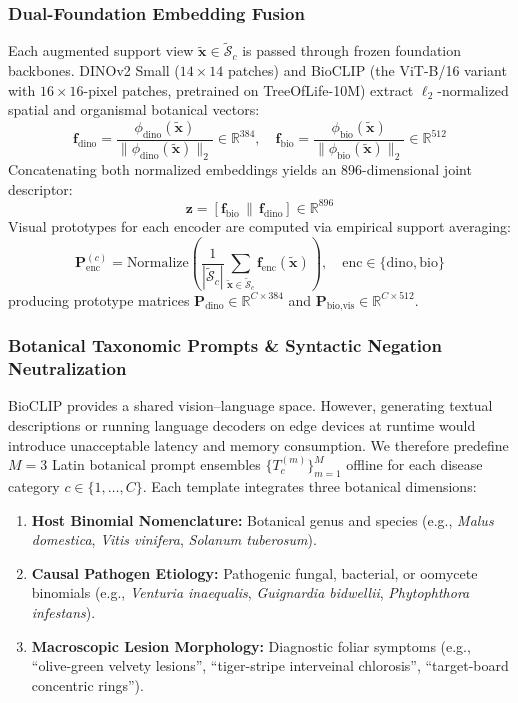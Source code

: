 \documentclass[preprint,12pt]{elsarticle}
\begin{document}
\subsubsection{Dual-Foundation Embedding Fusion}
Each augmented support view $\tilde{\mathbf{x}} \in \tilde{\mathcal{S}}_c$ is passed through frozen foundation backbones. DINOv2 Small ($14\times 14$ patches) \cite{oquab2023dinov2} and BioCLIP (the ViT-B/16 variant with $16\times16$-pixel patches, pretrained on TreeOfLife-10M) \cite{stevens2024bioclip} extract $\ell_2$-normalized spatial and organismal botanical vectors:
\begin{equation}
    \mathbf{f}_{\text{dino}} = \frac{\phi_{\text{dino}}(\tilde{\mathbf{x}})}{\|\phi_{\text{dino}}(\tilde{\mathbf{x}})\|_2} \in \mathbb{R}^{384}, \quad
    \mathbf{f}_{\text{bio}} = \frac{\phi_{\text{bio}}(\tilde{\mathbf{x}})}{\|\phi_{\text{bio}}(\tilde{\mathbf{x}})\|_2} \in \mathbb{R}^{512}
\end{equation}
Concatenating both normalized embeddings yields an 896-dimensional joint descriptor:
\begin{equation}
    \mathbf{z} = [\mathbf{f}_{\text{bio}} \,\|\, \mathbf{f}_{\text{dino}}] \in \mathbb{R}^{896}
\end{equation}
Visual prototypes for each encoder are computed via empirical support averaging:
\begin{equation}
    \mathbf{P}_{\text{enc}}^{(c)} = \text{Normalize}\left(\frac{1}{|\tilde{\mathcal{S}}_c|}\sum_{\tilde{\mathbf{x}} \in \tilde{\mathcal{S}}_c} \mathbf{f}_{\text{enc}}(\tilde{\mathbf{x}})\right), \quad \text{enc} \in \{\text{dino}, \text{bio}\}
\end{equation}
producing prototype matrices $\mathbf{P}_{\text{dino}} \in \mathbb{R}^{C \times 384}$ and $\mathbf{P}_{\text{bio,vis}} \in \mathbb{R}^{C \times 512}$.

\subsubsection{Botanical Taxonomic Prompts \& Syntactic Negation Neutralization}
BioCLIP provides a shared vision--language space. However, generating textual descriptions or running language decoders on edge devices at runtime would introduce unacceptable latency and memory consumption. We therefore predefine $M=3$ Latin botanical prompt ensembles $\{T_c^{(m)}\}_{m=1}^M$ offline for each disease category $c \in \{1, \dots, C\}$. Each template integrates three botanical dimensions:
\begin{enumerate}
    \item \textbf{Host Binomial Nomenclature:} Botanical genus and species (e.g., \textit{Malus domestica}, \textit{Vitis vinifera}, \textit{Solanum tuberosum}).
    \item \textbf{Causal Pathogen Etiology:} Pathogenic fungal, bacterial, or oomycete binomials (e.g., \textit{Venturia inaequalis}, \textit{Guignardia bidwellii}, \textit{Phytophthora infestans}).
    \item \textbf{Macroscopic Lesion Morphology:} Diagnostic foliar symptoms (e.g., ``olive-green velvety lesions'', ``tiger-stripe interveinal chlorosis'', ``target-board concentric rings'').
\end{enumerate}
\end{document}
